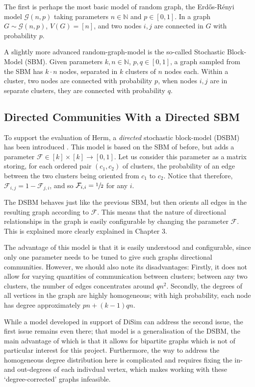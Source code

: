 The first is perhaps the most basic model of random graph, the Erd\H{o}s-R\'enyi model $\mathcal{G}(n,p)$ 
taking parameters $n \in \mathbb{N}$ and $p \in [0, 1]$. In a graph $G \sim \mathcal{G}(n,p)$, 
$V(G) = [n]$, and two nodes $i,j$ are connected in $G$ with probability $p$.

A slightly more advanced random-graph-model is the so-called Stochastic Block-Model (SBM). Given
parameters $k, n \in \mathbb{N}$, $p, q \in [0,1]$, a graph sampled from the SBM has $k \cdot n$
nodes, separated in $k$ clusters of $n$ nodes each. Within a cluster, two nodes are connected with
probability $p$, when nodes $i, j$ are in separate clusters, they are connected with probability 
$q$.  

\subsection{Directed Communities With a Directed SBM}

To support the evaluation of Herm, a \emph{directed} stochastic 
block-model (DSBM) has been introduced \cite{lucapaper}. This model is based on the SBM of before, but adds a parameter $\mathcal{F}
\in [k] \times [k] \rightarrow [0,1]$. Let us consider this parameter as a matrix storing, for each
ordered pair $(c_1, c_2)$ of clusters, the probability of an edge between the two clusters being 
oriented from $c_1$ to $c_2$. Notice that therefore, $\mathcal{F}_{i,j} = 1-\mathcal{F}_{j,i}$, and
so $\mathcal{F}_{i,i} = \sfrac{1}{2}$ for any $i$.

The DSBM behaves just like the previous SBM, but then orients all edges in the resulting graph 
according to $\mathcal{F}$. This means that the nature of directional relationships in the graph
is easily configurable by changing the parameter $\mathcal{F}$. This is explained more clearly 
explained in Chapter 3.

The advantage of this model is that it is easily understood and configurable, since only one 
parameter needs to be tuned to give such graphs directional communities. However, 
we should also note its disadvantages: Firstly, it does not allow for varying quantities of 
communication between clusters; between any two clusters, the number of edges concentrates around 
$qn^2$. Secondly, the degrees of all vertices in the graph are highly homogeneous; with high 
probability, each node has degree approximately $pn + 
(k-1) q n$. 

While a model developed in support of DiSim can address 
the second issue, the first issue remains even there; that model is a generalisation of the DSBM, 
the main advantage of which is that it allows for bipartite graphs which is not of particular 
interest for this project. Furthermore, the way to address the homogeneous degree distribution 
here is complicated and requires  fixing the in- and out-degrees of each indivdual vertex, which 
makes working with these `degree-corrected' graphs infeasible. 

